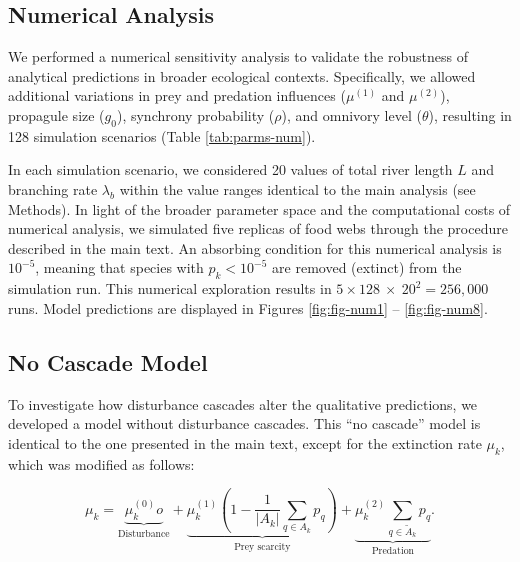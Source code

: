 \documentclass[11pt, class=article, crop=false]{standalone}
\theoremstyle{definition}
\begin{document}
\newpage

\subsection{Numerical Analysis}

We performed a numerical sensitivity analysis to validate the robustness of analytical predictions in broader ecological contexts.
Specifically, we allowed additional variations in prey and predation influences ($\mu^{(1)}$ and $\mu^{(2)}$), propagule size ($g_0$), synchrony probability ($\rho$), and omnivory level ($\theta$), resulting in 128 simulation scenarios (Table \ref{tab:parms-num}).

In each simulation scenario, we considered 20 values of total river length $L$ and branching rate $\lambda_b$ within the value ranges identical to the main analysis (see Methods).
In light of the broader parameter space and the computational costs of numerical analysis, we simulated five replicas of food webs through the procedure described in the main text.
An absorbing condition for this numerical analysis is $10^{-5}$, meaning that species with $p_k < 10^{-5}$ are removed (extinct) from the simulation run.
This numerical exploration results in $5 \times 128~\times~20^2 = 256,000$ runs.
Model predictions are displayed in Figures \ref{fig:fig-num1} -- \ref{fig:fig-num8}.

\vspace{0.5cm} 

\vspace{0.5cm} 

\newpage



\subsection{No Cascade Model}

To investigate how disturbance cascades alter the qualitative predictions, we developed a model without disturbance cascades.
This ``no cascade'' model is identical to the one presented in the main text, except for the extinction rate $\mu_k$, which was modified as follows:

\begin{equation}
    \mu_{k} = 
        \underbrace{\mu_{k}^{(0)} o}_{\text{Disturbance}} + 
        \underbrace{\mu_{k}^{(1)} \left(1 - \frac{1}{|A_k|}\sum_{q \in A_k} p_{q} \right)}_{\text{Prey scarcity}} + 
        \underbrace{\mu_{k}^{(2)} \sum_{q \in \tilde{A}_k} p_{q}}_{\text{Predation}}.
\end{equation}
\end{document}

